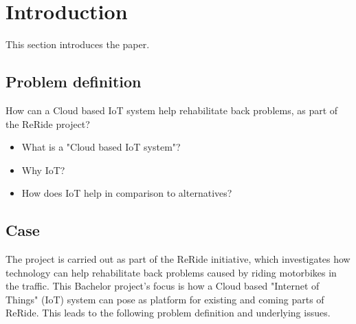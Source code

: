 \section{Introduction}
This section introduces the paper.

\subsection{Problem definition}
How can a Cloud based IoT system help rehabilitate back problems, as part of the ReRide project?
\begin{itemize}
	\item What is a "Cloud based IoT system"?
	\item Why IoT?
	\item How does IoT help in comparison to alternatives?
\end{itemize}

\subsection{Case}
The project is carried out as part of the ReRide initiative\cite{article:reride}, which investigates how technology can help rehabilitate back problems caused by riding motorbikes in the traffic. This Bachelor project's focus is how a Cloud based "Internet of Things" (IoT) system can pose as platform for existing and coming parts of ReRide. This leads to the following problem definition and underlying issues.